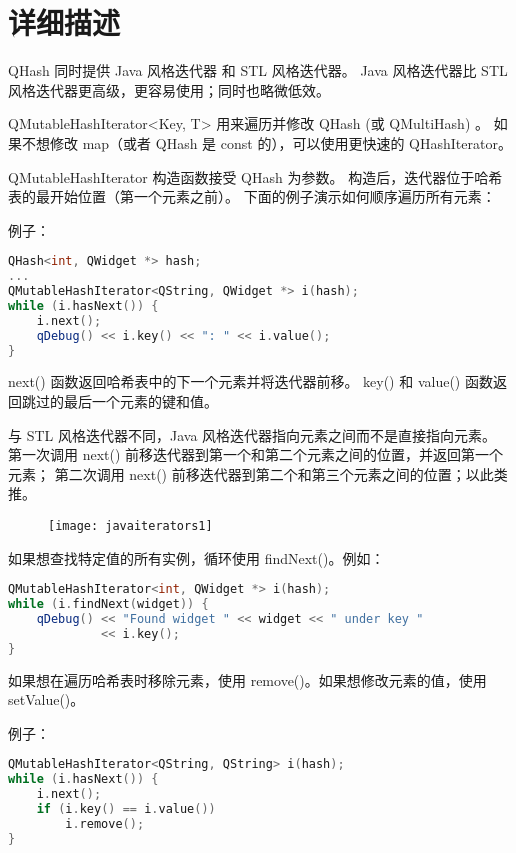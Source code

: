 \section{详细描述}

QHash 同时提供 Java 风格迭代器 和 STL 风格迭代器。
Java 风格迭代器比 STL 风格迭代器更高级，更容易使用；同时也略微低效。

QMutableHashIterator<Key, T> 用来遍历并修改 QHash (或 QMultiHash) 。
如果不想修改 map（或者 QHash 是 const 的），可以使用更快速的 QHashIterator。

QMutableHashIterator 构造函数接受 QHash 为参数。
构造后，迭代器位于哈希表的最开始位置（第一个元素之前）。
下面的例子演示如何顺序遍历所有元素：

例子：

\begin{lstlisting}[language=C++]
QHash<int, QWidget *> hash;
...
QMutableHashIterator<QString, QWidget *> i(hash);
while (i.hasNext()) {
    i.next();
    qDebug() << i.key() << ": " << i.value();
}
\end{lstlisting}

next() 函数返回哈希表中的下一个元素并将迭代器前移。
key() 和 value() 函数返回跳过的最后一个元素的键和值。

与 STL 风格迭代器不同，Java 风格迭代器指向元素之间而不是直接指向元素。
第一次调用 next() 前移迭代器到第一个和第二个元素之间的位置，并返回第一个元素；
第二次调用 next() 前移迭代器到第二个和第三个元素之间的位置；以此类推。

\begin{figure}[hbt!]  
	\centering
    \texttt{[image: javaiterators1]}
\end{figure}


如果想查找特定值的所有实例，循环使用 findNext()。例如：

\begin{lstlisting}[language=C++]
QMutableHashIterator<int, QWidget *> i(hash);
while (i.findNext(widget)) {
    qDebug() << "Found widget " << widget << " under key "
             << i.key();
}
\end{lstlisting}

如果想在遍历哈希表时移除元素，使用 remove()。如果想修改元素的值，使用 setValue()。

例子：

\begin{lstlisting}[language=C++]
QMutableHashIterator<QString, QString> i(hash);
while (i.hasNext()) {
    i.next();
    if (i.key() == i.value())
        i.remove();
}
\end{lstlisting}


